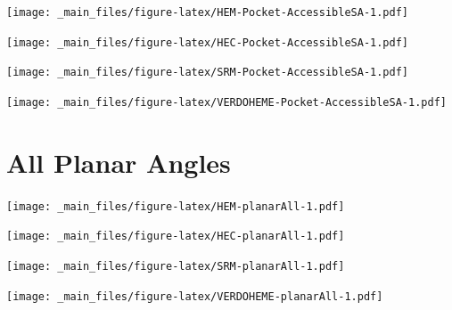 \documentclass[a4paper, nobind]{templates/ociamthesis}
\let\origfigure\figure
\let\endorigfigure\endfigure
\renewenvironment{figure}[1][2] {
    \expandafter\origfigure\expandafter[H]
} {
    \endorigfigure
}
\begin{document}
\begin{figure}
\centering
\texttt{[image: \_main\_files/figure-latex/HEM-Pocket-AccessibleSA-1.pdf]}
\caption{\label{fig:HEM-Pocket-AccessibleSA}HEM: Pocket Accessible Surface Area}
\end{figure}

\begin{figure}
\centering
\texttt{[image: \_main\_files/figure-latex/HEC-Pocket-AccessibleSA-1.pdf]}
\caption{\label{fig:HEC-Pocket-AccessibleSA}HEC: Pocket Accessible Surface Area}
\end{figure}

\begin{figure}
\centering
\texttt{[image: \_main\_files/figure-latex/SRM-Pocket-AccessibleSA-1.pdf]}
\caption{\label{fig:SRM-Pocket-AccessibleSA}SRM: Pocket Accessible Surface Area}
\end{figure}

\begin{figure}
\centering
\texttt{[image: \_main\_files/figure-latex/VERDOHEME-Pocket-AccessibleSA-1.pdf]}
\caption{\label{fig:VERDOHEME-Pocket-AccessibleSA}VERDOHEME: Pocket Accessible Surface Area}
\end{figure}

\hypertarget{figs-planarAll}{%
\section{All Planar Angles}\label{figs-planarAll}}

\begin{figure}
\centering
\texttt{[image: \_main\_files/figure-latex/HEM-planarAll-1.pdf]}
\caption{\label{fig:HEM-planarAll}HEM: All Planar Angles}
\end{figure}

\begin{figure}
\centering
\texttt{[image: \_main\_files/figure-latex/HEC-planarAll-1.pdf]}
\caption{\label{fig:HEC-planarAll}HEC: All Planar Angles}
\end{figure}

\begin{figure}
\centering
\texttt{[image: \_main\_files/figure-latex/SRM-planarAll-1.pdf]}
\caption{\label{fig:SRM-planarAll}SRM: All Planar Angles}
\end{figure}

\begin{figure}
\centering
\texttt{[image: \_main\_files/figure-latex/VERDOHEME-planarAll-1.pdf]}
\caption{\label{fig:VERDOHEME-planarAll}VERDOHEME: All Planar Angles}
\end{figure}
\end{document}
